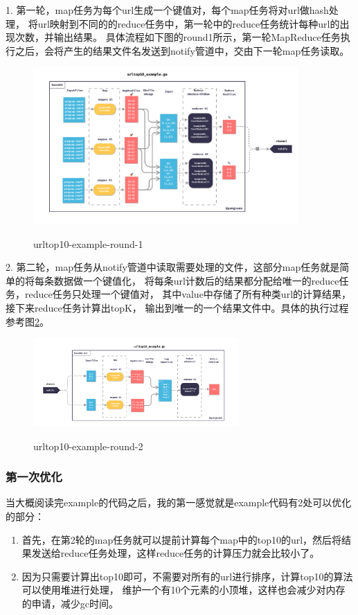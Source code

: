 \documentclass[UTF8]{ctexart}
\begin{document}
1. 第一轮，map任务为每个url生成一个键值对，每个map任务将对url做hash处理，
将url映射到不同的的reduce任务中，第一轮中的reduce任务统计每种url的出现次数，并输出结果。
具体流程如下图的round1所示，第一轮MapReduce任务执行之后，会将产生的结果文件名发送到notify管道中，交由下一轮map任务读取。
 \begin{figure}[H]
  \centering
  \includegraphics[width=0.9\textwidth]{fig/mr-example-1.pdf}\\
  \caption{urltop10-example-round-1}
  \label{mre1}
\end{figure}
2. 第二轮，map任务从notify管道中读取需要处理的文件，这部分map任务就是简单的将每条数据做一个键值化，
将每条url计数后的结果都分配给唯一的reduce任务，reduce任务只处理一个键值对，
其中value中存储了所有种类url的计算结果，接下来reduce任务计算出topK，
输出到唯一的一个结果文件中。具体的执行过程参考图\ref{mre2}。
\begin{figure}[H]
  \centering
  \includegraphics[width=0.7\textwidth]{fig/mr-example-2.pdf}\\
  \caption{urltop10-example-round-2}
  \label{mre2}
\end{figure}

\subsubsection{第一次优化}

当大概阅读完example的代码之后，我的第一感觉就是example代码有2处可以优化的部分：
\begin{enumerate}
  \item 首先，在第2轮的map任务就可以提前计算每个map中的top10的url，然后将结果发送给reduce任务处理，这样reduce任务的计算压力就会比较小了。
  \item 因为只需要计算出top10即可，不需要对所有的url进行排序，计算top10的算法可以使用堆进行处理，
        维护一个有10个元素的小顶堆，这样也会减少对内存的申请，减少gc时间。
\end{enumerate}
\end{document}
